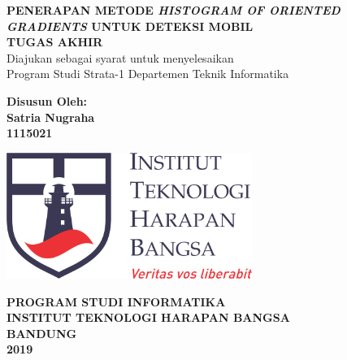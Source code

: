 \begin{titlepage}
\begin{center}
	\onehalfspacing
	{\large \bfseries PENERAPAN METODE \textit{HISTOGRAM OF ORIENTED GRADIENTS} UNTUK DETEKSI MOBIL\\
	\vspace{1.5cm}
	 \large TUGAS AKHIR}\\
           Diajukan sebagai syarat untuk menyelesaikan\\ Program Studi Strata-1 Departemen Teknik Informatika

	\vspace{1.5cm}
          {\bfseries Disusun Oleh: \\
           Satria Nugraha \\
	1115021}
	
	\vspace{1.5cm}
	\includegraphics[width=8cm]{images/ithb.png}
	
	
	\vspace{3.5cm}
	
{\large \bfseries PROGRAM STUDI INFORMATIKA \\
INSTITUT TEKNOLOGI HARAPAN BANGSA \\
BANDUNG\\
2019}

	
\end{center}

\end{titlepage}

\newpage